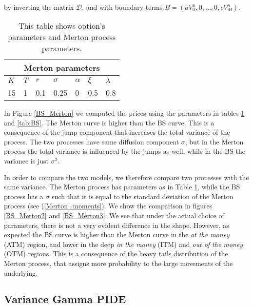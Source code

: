 by inverting the matrix $\mathcal{D}$, and with boundary terms $B = (a V^{n}_{0}, 0, ... , 0, c V^{n}_{M})$.  
\begin{table}[t]
 \begin{center}
 \begin{minipage}{0.8\linewidth}
  \centering
  \begin{tabular}{||l|l|l||l|l|l|l||}
  \hline
  \multicolumn{7}{|c|}{Merton parameters} \\
  \hline
  $K$ & $T$ & $r$ & $\sigma$ & $\alpha$ &$\xi$ & $\lambda$ \\
  \hline
  15 & 1 & 0.1 & 0.25 & 0 & 0.5 & 0.8 \\
  \hline
  \end{tabular}
  \caption{This table shows option's parameters and Merton process parameters.}
  \label{tab:Mert}
 \end{minipage}
 \end{center}
\end{table}
In Figure \ref{BS_Merton} we computed the prices using the parameters in tables \ref{tab:Mert} and \ref{tab:BS}. The Merton curve is higher than the BS curve. This is a consequence 
of the jump component that increases the total variance of the process. The two processes have same diffusion component $\sigma$, but in the Merton process the total variance is influenced
by the jumps as well, while in the BS the variance is just $\sigma^2$.

In order to compare the two models, we therefore compare two processes with the same variance. The Merton process has parameters as in Table \ref{tab:Mert}, while the BS process has a $\sigma$
such that it is equal to the standard deviation of the Merton process (see (\ref{Merton_moments}).
We show the comparison in figures \ref{BS_Merton2} and \ref{BS_Merton3}. We see that under the actual choice of parameters, there is not a very evident difference in the shape.
However, as expected the BS curve is higher than the Merton curve in the \emph{at the money} (ATM) region, and lower in the deep \emph{in the money} (ITM) 
and \emph{out of the money} (OTM) regions.
This is a consequence of the heavy tails distribution of the Merton process, that assigns more probability to the large movements of the underlying.  


\subsection{Variance Gamma PIDE}\label{VG_section2}


